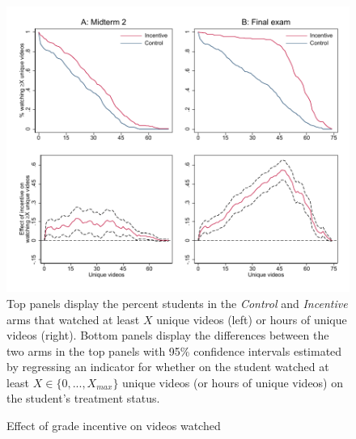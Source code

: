 \documentclass[12pt]{article}
\begin{document}
\clearpage
\begin{figure}[t]
\begin{center}
\caption{Effect of grade incentive on videos watched}
\label{combo_cdf}
\includegraphics[width=1\textwidth, angle=0]{../plots/combo_cdf.pdf}
\footnotesize Top panels display the percent students in the \textit{Control}
 and \textit{Incentive} arms that watched at least $X$ unique videos (left) or hours of unique videos (right). Bottom panels display the differences between the two arms in the top panels with 95\% confidence intervals estimated by regressing an indicator for whether on the student watched at least $X\in\{0,...,X_{max}\}$ unique videos (or hours of unique videos) on the student's treatment status.
\end{center}
\end{figure}
\end{document}
